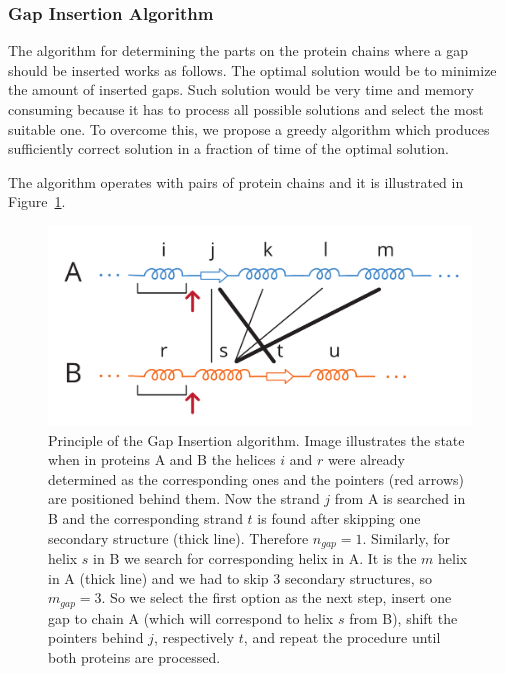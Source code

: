 \documentclass[twocolumn]{bmcart}%
\begin{document}
\subsubsection*{Gap Insertion Algorithm}
\label{sec:alg}
The algorithm for determining the parts on the protein chains where a gap should be inserted works as follows. 
The optimal solution would be to minimize the amount of inserted gaps.
Such solution would be very time and memory consuming because it has to process all possible solutions and select the most suitable one.
To overcome this, we propose a greedy algorithm which produces sufficiently correct solution in a fraction of time of the optimal solution.

The algorithm operates with pairs of protein chains and it is illustrated in Figure~\ref{fig:alg1}.

\begin{figure}[hbt]
  \centering
  \includegraphics[width=0.9\linewidth]{pics/first.pdf}
  \caption{Principle of the Gap Insertion algorithm. Image illustrates the state when in proteins A and B the helices $i$ and $r$ were already determined as the corresponding ones and the pointers (red arrows) are positioned behind them. Now the strand $j$ from A is searched in B and the corresponding strand $t$ is found after skipping one secondary structure (thick line). Therefore $n_{gap} = 1$. Similarly, for helix $s$ in B we search for corresponding helix in A. It is the $m$ helix in A (thick line) and we had to skip 3 secondary structures, so  $m_{gap} = 3$. So we select the first option as the next step, insert one gap to chain A (which will correspond to helix $s$ from B), shift the pointers behind $j$, respectively $t$, and repeat the procedure until both proteins are processed.}
  \label{fig:alg1}
\end{figure}
\end{document}
